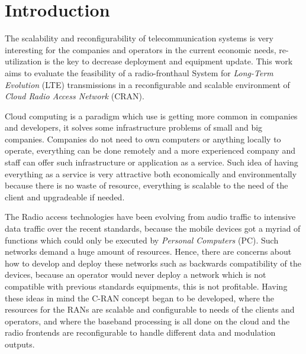 \chapter{Introduction}
\label{chap:intro}


The scalability and reconfigurability of telecommunication systems is very
interesting for the companies and operators in the current economic needs,
re-utilization is the key to decrease deployment and equipment update. This work
aims to evaluate the feasibility of a radio-fronthaul System for
\textit{Long-Term Evolution} (LTE) transmissions in a reconfigurable and scalable
environment of \textit{Cloud Radio Access Network} (CRAN).

Cloud computing is a paradigm which use is getting more common in companies and
developers, it solves some infrastructure problems of small and big companies.
Companies do not need to own computers or anything locally to operate,
everything can be done remotely and a more experienced company and staff can
offer such infrastructure or application as a service. Such idea of having
everything as a service is very attractive both economically  and
environmentally because there is no waste of resource, everything is scalable to
the need of the client and upgradeable if needed.

The Radio access technologies have been evolving from audio traffic to intensive
data traffic over the recent standards, because the mobile devices got a myriad
of functions which could only be executed by \textit{Personal Computers} (PC).
Such networks demand a huge amount of resources. Hence, there are concerns about
how to develop and deploy these networks such as backwards compatibility of the
devices, because an operator would never deploy a network which is not
compatible with previous standards equipments, this is not profitable. Having
these ideas in mind the C-RAN concept began to be developed,  where the
resources for the RANs are scalable and configurable to needs of the clients and
operators, and where the baseband processing is all done on the cloud and the
radio frontends are reconfigurable to handle different data and modulation
outputs.

